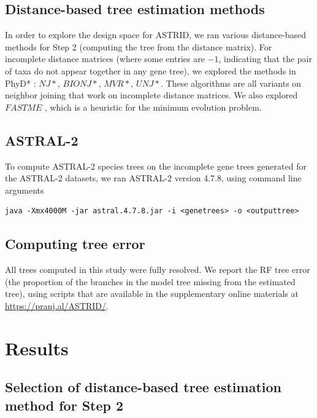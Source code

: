 \subsection{Distance-based tree estimation methods}
In order to explore the design space for ASTRID, we 
ran various distance-based methods for Step 2 (computing the
tree from the distance matrix).
For incomplete distance matrices (where some entries
are $-1$, indicating that the pair of taxa do not
appear together in any gene tree), we explored the
methods  in PhyD* \cite{phydstar}: $NJ*$, $BIONJ*$, $MVR*$,
$UNJ*$. These
algorithms are all variants on neighbor joining that work on incomplete distance matrices.
We also explored
$FASTME$ \cite{Desper2002}, which is a heuristic for the
minimum 
evolution problem.

\subsection{ASTRAL-2}
To compute ASTRAL-2 species trees on the incomplete gene trees
generated for the ASTRAL-2 datasets, 
we ran ASTRAL-2 version 4.7.8, using command line arguments 
\begin{verbatim}
java -Xmx4000M -jar astral.4.7.8.jar -i <genetrees> -o <outputtree>
\end{verbatim}

\subsection{Computing tree error}
All trees computed in this study were fully resolved. 
We report the RF tree error (the proportion of the
branches in the model tree missing from the estimated tree),
using scripts that 
are available in the supplementary online
materials at \url{https://pranj.al/ASTRID/}. 

\section{Results}


\subsection{Selection of distance-based tree estimation method for Step 2}

